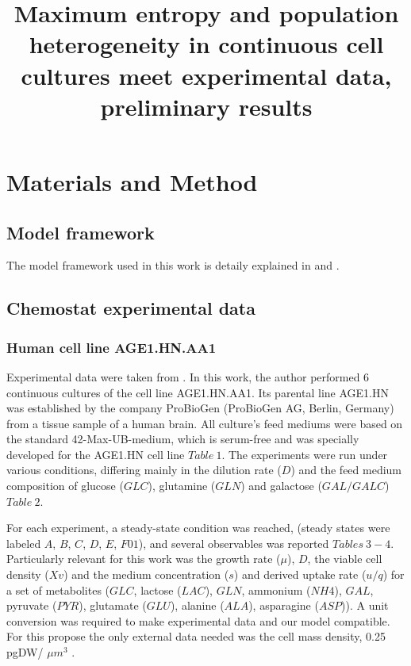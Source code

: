 \documentclass[]{article}
\title{Maximum entropy and population heterogeneity in 
	continuous cell cultures meet experimental data, preliminary results}
\author{}
\begin{document}
	
	\maketitle
	
	\section{Materials and Method}
	
	
	\subsection{Model framework }
	The model framework used in this work is detaily explained in  and .
	
	\subsection{Chemostat experimental data} 
	
	\subsubsection{Human cell line AGE1.HN.AA1} 
	Experimental data were taken from . In this work, the author performed 6 continuous cultures of the cell line AGE1.HN.AA1. Its parental line AGE1.HN was established by the company ProBioGen (ProBioGen AG, Berlin, Germany) from a tissue sample of a human brain. All culture's feed mediums were based on the standard 42-Max-UB-medium, which is serum-free and was specially developed for the AGE1.HN cell line $Table\ 1$. The experiments were run under various conditions, differing mainly in the dilution rate ($D$) and the feed medium composition of glucose ($GLC$), glutamine ($GLN$) and galactose ($GAL/GALC$) $Table\ 2$.
	
	For each experiment, a steady-state condition was reached, (steady states were labeled $A$, $B$, $C$, $D$, $E$, $F01$), and several observables  was reported $Tables\ 3-4$. Particularly relevant for this work was the growth rate ($\mu$), $D$, the viable cell density ($Xv$) and the medium concentration ($s$) and derived uptake rate ($u/q$) for a set of metabolites ($GLC$, lactose ($LAC$), $GLN$, ammonium ($NH4$), $GAL$, pyruvate ($PYR$), glutamate ($GLU$), alanine ($ALA$), asparagine ($ASP$)). A unit conversion was required to make experimental data and our model compatible. For this propose the only external data needed was the cell mass density, 0.25 pgDW/ $\mu$$m^3$ .
	
\end{document}
